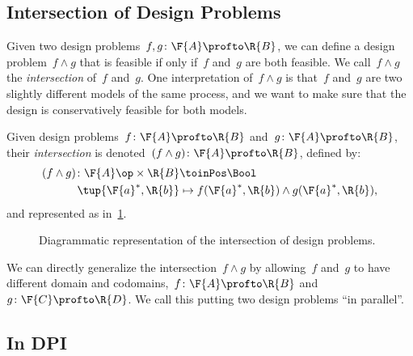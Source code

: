 \subsection{Intersection of Design Problems}

Given two design problems~$f, g \colon \F{A} \profto \R{B}$, we can define a design problem~$f \wedge g$ that is feasible if only if~$f$ and~$g$ are both feasible. We call~$f \wedge g$ the \emph{intersection} of~$f$ and~$g$. One interpretation of~$f \wedge g$ is that~$f$ and~$g$ are two slightly different models of the same process, and we want to make sure that the design is conservatively feasible for both models.

\begin{definition}
  \label{def:dp-intersection}
  Given design problems~$f\colon \F{A} \profto \R{B}$ and~$g\colon \F{A} \profto \R{B}$,
  their \emph{intersection} is denoted~$(f \wedge g)\colon \F{A} \profto \R{B}$, defined by:
  \begin{equation}
    \begin{aligned}
    (f \wedge g)
      \colon \F{A}\op \times \R{B} & \toinPos \Bool \\
      \tup{\F{a}^*, \R{b}} & \mapsto f(\F{a}^*, \R{b}) \wedge  g(\F{a}^*, \R{b}),
    \end{aligned}
  \end{equation}
  and represented as in~\cref{fig:intersectiondp}.
\end{definition}

\begin{figure}[h!]
  \begin{center}
  \end{center}
  \caption{Diagrammatic representation of the intersection of design problems. }
  \label{fig:intersectiondp}
\end{figure}

We can directly generalize the intersection~$f \wedge g$ by allowing~$f$ and~$g$ to have different domain and codomains,~$f \colon \F{A} \profto \R{B}$ and~$g \colon \F{C} \profto \R{D}$. We call this putting two design problems ``in parallel''.

\subsection{In DPI}\label{subsec:dpi-intersection}

